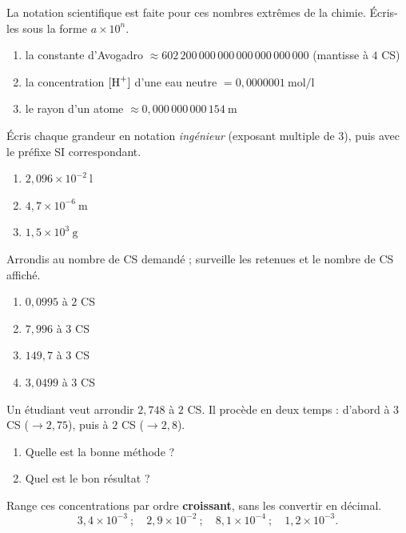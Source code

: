 \documentclass[11pt,a4paper]{article}
\begin{document}
\begin{exo}
La notation scientifique est faite pour ces nombres extrêmes de la chimie. Écris-les sous la forme
$a\times10^{n}$.
\begin{enumerate}[label=\alph*)]
  \item la constante d'Avogadro $\approx 602\,200\,000\,000\,000\,000\,000\,000$ (mantisse à $4$ CS)
  \item la concentration $[\ce{H+}]$ d'une eau neutre $= 0,0000001\ \si{\mol\per\litre}$
  \item le rayon d'un atome $\approx 0,000\,000\,000\,154\ \si{\metre}$
\end{enumerate}
\end{exo}

\begin{exo}
Écris chaque grandeur en notation \emph{ingénieur} (exposant multiple de $3$), puis avec le préfixe SI
correspondant.
\begin{enumerate}[label=\alph*)]
  \item $2,096\times10^{-2}\ \si{\litre}$
  \item $4,7\times10^{-6}\ \si{\metre}$
  \item $1,5\times10^{3}\ \si{\gram}$
\end{enumerate}
\end{exo}

\begin{exo}
Arrondis au nombre de CS demandé ; surveille les retenues et le nombre de CS affiché.
\begin{enumerate}[label=\alph*)]
  \item $0,0995$ à $2$ CS
  \item $7,996$ à $3$ CS
  \item $149,7$ à $3$ CS
  \item $3,0499$ à $3$ CS
\end{enumerate}
\end{exo}

\begin{exo}
Un étudiant veut arrondir $2,748$ à $2$ CS. Il procède en deux temps : d'abord à $3$ CS ($\to 2,75$),
puis à $2$ CS ($\to 2,8$).
\begin{enumerate}[label=\alph*)]
  \item Quelle est la bonne méthode ?
  \item Quel est le bon résultat ?
\end{enumerate}
\end{exo}

\begin{exo}
Range ces concentrations par ordre \textbf{croissant}, sans les convertir en décimal.
\[ 3,4\times10^{-3}\ ;\quad 2,9\times10^{-2}\ ;\quad 8,1\times10^{-4}\ ;\quad 1,2\times10^{-3}. \]
\end{exo}
\end{document}
